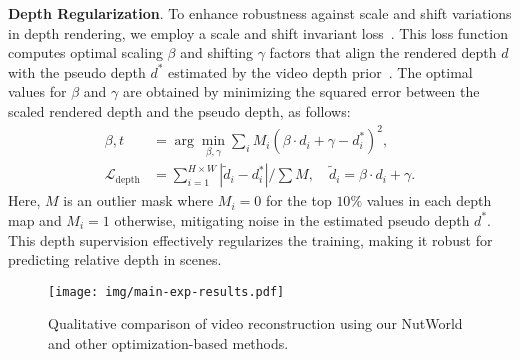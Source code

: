 \noindent\textbf{Depth Regularization}. To enhance robustness against scale and shift variations in depth rendering, we employ a scale and shift invariant loss~\cite{bhat2023zoedepth, ranftl2020towards}. This loss function computes optimal scaling $\beta$ and shifting $\gamma$ factors that align the rendered depth $d$ with the pseudo depth $d^*$ estimated by the video depth prior~\cite{chen2025video}. 
% 
The optimal values for $\beta$ and $\gamma$ are obtained by minimizing the squared error between the scaled rendered depth and the pseudo depth, as follows:
\begin{equation}
\begin{aligned}
    \beta, t &= \arg \min_{\beta, \gamma} \sum_{i} M_{i} \left( \beta \cdot d_{i} + \gamma - d^{*}_{i} \right)^2, \\
    \mathcal{L}_{\text{depth}} &= \sum_{i=1}^{H \times W} | \tilde{d}_{i} - d^{*}_{i} | / {\sum M}, \quad \tilde{d}_{i} = \beta \cdot d_{i} + \gamma.
\end{aligned}
\label{eq:depth_prior}
\end{equation}
Here, $M$ is an outlier mask where $M_i=0$ for the top $10\%$ values in each depth map and $M_i=1$ otherwise, mitigating noise in the estimated pseudo depth $d^*$. This depth supervision effectively regularizes the training, making it robust for predicting relative depth in scenes.  



\begin{figure*}[t]
\centering 
\texttt{[image: img/main-exp-results.pdf]} 
\caption{Qualitative comparison of video reconstruction using our NutWorld and other optimization-based methods.}
\label{fig:main-comparison}
\end{figure*}



